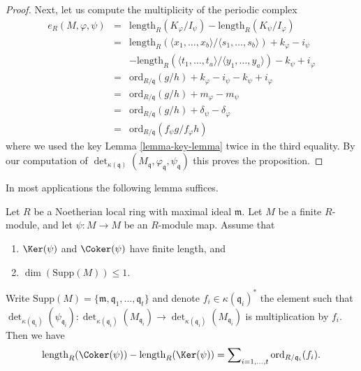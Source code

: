 \begin{proof}
\medskip\noindent
Next, let us compute the multiplicity of the periodic complex
\begin{eqnarray*}
e_R(M, \varphi, \psi) & = &
\text{length}_R(K_\varphi/I_\psi) - \text{length}_R(K_\psi/I_\varphi) \\
& = &
\text{length}_R(
\langle x_1, \ldots, x_b\rangle/
\langle s_1, \ldots, s_b\rangle)
+ k_\varphi - i_\psi \\
& & -
\text{length}_R(
\langle t_1, \ldots, t_a\rangle/
\langle y_1, \ldots, y_a\rangle)
- k_\psi + i_\varphi \\
& = &
\text{ord}_{R/\mathfrak q}(g/h) + k_\varphi - i_\psi - k_\psi + i_\varphi \\
& = &
\text{ord}_{R/\mathfrak q}(g/h) + m_\varphi - m_\psi \\
& = &
\text{ord}_{R/\mathfrak q}(g/h) + \delta_\psi - \delta_\varphi \\
& = &
\text{ord}_{R/\mathfrak q}(f_\psi g/f_\varphi h)
\end{eqnarray*}
where we used the key Lemma \ref{lemma-key-lemma} twice in the third equality.
By our computation of $\det_{\kappa(\mathfrak q)}
(M_{\mathfrak q}, \varphi_{\mathfrak q}, \psi_{\mathfrak q})$
this proves the proposition.
\end{proof}

\noindent
In most applications the following lemma suffices.

\begin{lemma}
\label{lemma-application-herbrand-quotient}
Let $R$ be a Noetherian local ring with maximal ideal $\mathfrak m$.
Let $M$ be a finite $R$-module, and let $\psi : M \to M$ be an
$R$-module map. Assume that
\begin{enumerate}
\item $\Ker(\psi)$ and $\Coker(\psi)$ have finite length, and
\item $\dim(\text{Supp}(M)) \leq 1$.
\end{enumerate}
Write
$\text{Supp}(M) = \{\mathfrak m, \mathfrak q_1, \ldots, \mathfrak q_t\}$
and denote $f_i \in \kappa(\mathfrak q_i)^*$ the element such that
$\det_{\kappa(\mathfrak q_i)}(\psi_{\mathfrak q_i}) :
\det_{\kappa(\mathfrak q_i)}(M_{\mathfrak q_i})
\to \det_{\kappa(\mathfrak q_i)}(M_{\mathfrak q_i})$
is multiplication by $f_i$. Then
we have
$$
\text{length}_R(\Coker(\psi))
-
\text{length}_R(\Ker(\psi))
=
\sum\nolimits_{i = 1, \ldots, t}
\text{ord}_{R/\mathfrak q_i}(f_i).
$$
\end{lemma}


